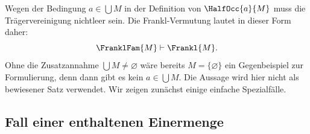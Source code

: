 \documentclass[main.tex]{subfiles}
\begin{document}
\begin{tabproof}
\end{tabproof}

\begin{tabproof}
\end{tabproof}

Wegen der Bedingung \(a\in\bigcup M\) in der Definition von
\(\HalfOcc{a}{M}\) muss die Trägervereinigung nichtleer sein. Die
Frankl-Vermutung lautet in dieser Form daher:
\[
  \FranklFam{M}\vdash \Frankl{M}.
\]
Ohne die Zusatzannahme \(\bigcup M\neq\varnothing\) wäre bereits
\(M=\{\varnothing\}\) ein Gegenbeispiel zur Formulierung, denn dann gibt es
kein \(a\in\bigcup M\). Die Aussage wird hier nicht als bewiesener Satz
verwendet. Wir zeigen zunächst einige einfache Spezialfälle.

\subsection{Fall einer enthaltenen Einermenge}

\begin{tabproof}
\end{tabproof}
\end{document}
